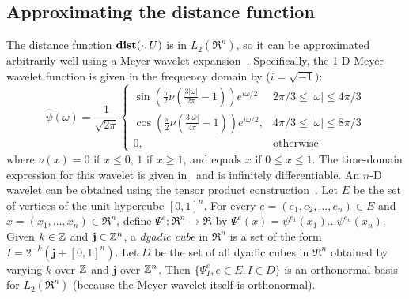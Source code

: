 \subsection{Approximating the distance function}
\label{sec:dist smoothing}
The distance function $\mathbf{dist}(\cdot,U)$ is in $L_2(\Re^n)$, so it can be approximated arbitrarily well using a Meyer wavelet expansion~\cite{DeVore_1998}.
Specifically, the 1-D Meyer wavelet function is given in the frequency domain by ($i = \sqrt{-1})$:
\[\widehat{\psi}(\omega) = \frac{1}{\sqrt{2\pi}} \left \lbrace 
\begin{matrix} \sin (\frac{\pi}{2}\nu(\frac{3|\omega|}{2\pi}-1))e^{i\omega/2} & 2\pi/3 \leq |\omega| \leq 4\pi/3 \\
\cos (\frac{\pi}{2}\nu(\frac{3|\omega|}{4\pi}-1))e^{i\omega/2}, & 4\pi/3 \leq |\omega| \leq 8\pi/3\\
0, &\text{otherwise}\end{matrix} \right. \]
where $\nu(x) = 0$ if $x\leq 0$, $1$ if $x \geq 1$, and equals $x$ if $0\leq x \leq 1$.
The time-domain expression for this wavelet is given in~\cite{Valenzuela15} and is infinitely differentiable.
An $n$-D wavelet can be obtained using the tensor product construction~\cite{DeVore_1998}.
Let $E$ be the set of vertices of the unit hypercube $[0,1]^n$.
For every $e = (e_1,e_2,\ldots,e_n) \in E$ and $x = (x_1,\ldots,x_n) \in \Re^n$, define $\Psi^e:\Re^n \rightarrow \Re$ by $\Psi^e(x)= \psi^{e_1}(x_1)\ldots \psi^{e_n}(x_n)$.
Given $k \in \mathbb{Z}$ and $\mathbf{j} \in \mathbb{Z}^n$, a \textit{dyadic cube} in $\Re^n$ is a set of the form $I = 2^{-k}(\mathbf{j} + [0,1]^n)$.
Let $D$ be the set of all dyadic cubes in $\Re^n$ obtained by varying $k$ over $\mathbb{Z}$ and $\mathbf{j}$ over $\mathbb{Z}^n$.
Then $\{\Psi^e_{I}, e \in E, I\in D\}$ is an orthonormal basis for $L_2(\Re^n)$ (because the Meyer wavelet itself is orthonormal).
